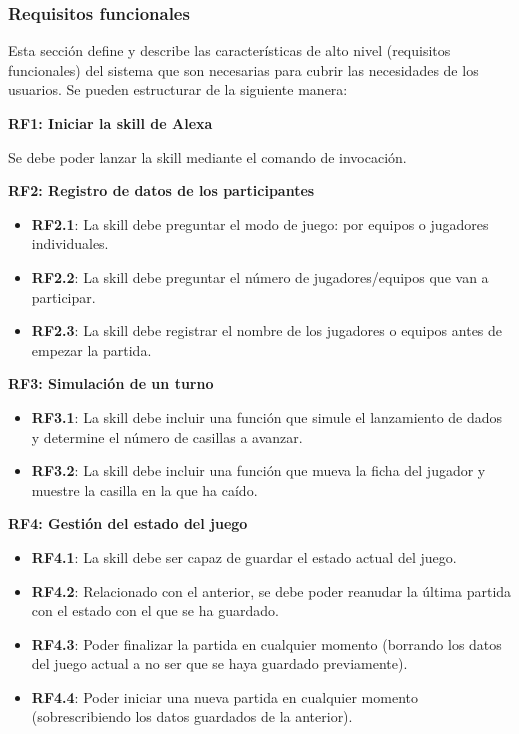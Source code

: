 \newpage
\subsubsection{Requisitos funcionales}

Esta sección define y describe las características de alto nivel (requisitos
funcionales) del sistema que son necesarias para cubrir las necesidades de los
usuarios. Se pueden estructurar de la siguiente manera:
\vspace{0.3cm}

\textbf{RF1: Iniciar la skill de Alexa}

Se debe poder lanzar la skill mediante el comando de invocación.
\vspace{0.5cm}

\textbf{RF2: Registro de datos de los participantes}
\begin{itemize}
	\item \textbf{RF2.1}: La skill debe preguntar el modo de juego: por equipos o jugadores individuales. 
	\item \textbf{RF2.2}: La skill debe preguntar el número de jugadores/equipos que van a participar.
	\item \textbf{RF2.3}: La skill debe registrar el nombre de los jugadores o equipos antes de empezar la partida.
\end{itemize}

\textbf{RF3: Simulación de un turno}
\begin{itemize}
    \item \textbf{RF3.1}: La skill debe incluir una función que simule el lanzamiento de dados y determine el número de casillas a avanzar.
    \item \textbf{RF3.2}: La skill debe incluir una función que mueva la ficha del jugador y muestre la casilla en la que ha caído.
\end{itemize}

\textbf{RF4: Gestión del estado del juego}
\begin{itemize}
    \item \textbf{RF4.1}: La skill debe ser capaz de guardar el estado actual del juego.
    \item \textbf{RF4.2}: Relacionado con el anterior, se debe poder reanudar la última partida con el estado con el que se ha guardado.
    \item \textbf{RF4.3}: Poder finalizar la partida en cualquier momento (borrando los datos del juego actual a no ser que se haya guardado previamente).
    \item \textbf{RF4.4}: Poder iniciar una nueva partida en cualquier momento (sobrescribiendo los datos guardados de la anterior).
\end{itemize}

